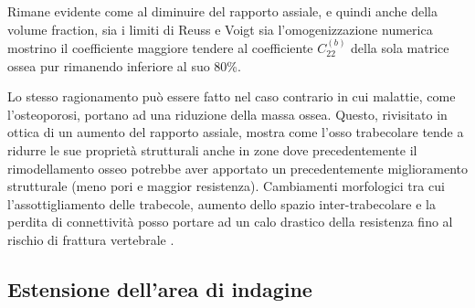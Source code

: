 \documentclass[a4paper,num-refs]{oup-contemporary}
\begin{document}
Rimane evidente come al diminuire del rapporto assiale, e quindi anche della volume fraction, sia i limiti di Reuss e Voigt sia l'omogenizzazione numerica mostrino il coefficiente maggiore tendere al coefficiente $C_{22}^{(b)}$ della sola matrice ossea pur rimanendo inferiore al suo 80\%.  

Lo stesso ragionamento può essere fatto nel caso contrario in cui malattie, come l'osteoporosi, portano ad una riduzione della massa ossea. Questo, rivisitato in ottica di un aumento del rapporto assiale, mostra come l'osso trabecolare tende a ridurre le sue proprietà strutturali anche in zone dove precedentemente il rimodellamento osseo potrebbe aver apportato un precedentemente miglioramento strutturale (meno pori e maggior resistenza). Cambiamenti morfologici tra cui l'assottigliamento delle trabecole, aumento dello spazio inter-trabecolare e la perdita di connettività posso portare ad un calo drastico della resistenza fino al rischio di frattura vertebrale \citep{Ferguson:2003}.







\subsection{Estensione dell'area di indagine}
\label{sec:estensione}
\end{document}
